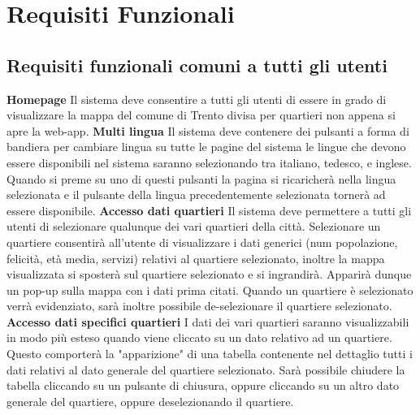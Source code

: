 \chapter{Requisiti Funzionali} 
\thispagestyle{stdPage}
    \section{Requisiti funzionali comuni a tutti gli utenti}
        \begin{rfList}
            \rfItem \textbf{Homepage} Il sistema deve consentire a tutti gli utenti di essere in grado di visualizzare la mappa del comune di Trento divisa per quartieri non appena si apre la web-app.
            \rfItem \textbf{Multi lingua} Il sistema deve contenere dei pulsanti a forma di bandiera per cambiare lingua su tutte le pagine del sistema le lingue che devono essere disponibili nel sistema saranno selezionando tra italiano, tedesco, e inglese. Quando si preme su uno di questi pulsanti la pagina si ricaricherà nella lingua selezionata e il pulsante della lingua precedentemente selezionata tornerà ad essere disponibile.
            \rfItem \textbf{Accesso dati quartieri} Il sistema deve permettere a tutti gli utenti di selezionare qualunque dei vari quartieri della città. Selezionare un quartiere consentirà all'utente di visualizzare i dati generici (num popolazione, felicità, età media, servizi) relativi al quartiere selezionato, inoltre la mappa visualizzata si sposterà sul quartiere selezionato e si ingrandirà. Apparirà dunque un pop-up sulla mappa con i dati prima citati. Quando un quartiere è selezionato verrà evidenziato, sarà inoltre possibile de-selezionare il quartiere selezionato.
            \rfItem \textbf{Accesso dati specifici quartieri} I dati dei vari quartieri saranno visualizzabili in modo più esteso quando viene cliccato su un dato relativo ad un quartiere. Questo comporterà la "apparizione" di una tabella contenente nel dettaglio tutti i dati relativi al dato generale del quartiere selezionato. Sarà possibile chiudere la tabella cliccando su un pulsante di chiusura, oppure cliccando su un altro dato generale del quartiere, oppure deselezionando il quartiere.
        \end{rfList} 
